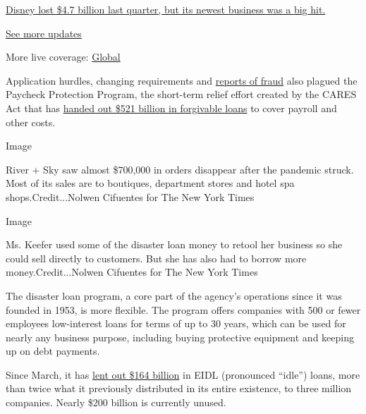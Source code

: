 \href{https://www.nytimes3xbfgragh.onion/live/2020/08/04/business/stock-market-today-coronavirus?action=click\&pgtype=Article\&state=default\&region=MAIN_CONTENT_1\&context=storylines_live_updates\#disney-lost-4-7-billion-last-quarter-but-its-newest-business-was-a-big-hit}{Disney
lost \$4.7 billion last quarter, but its newest business was a big hit.}

\href{https://www.nytimes3xbfgragh.onion/live/2020/08/04/business/stock-market-today-coronavirus?action=click\&pgtype=Article\&state=default\&region=MAIN_CONTENT_1\&context=storylines_live_updates}{See
more updates}

More live coverage:
\href{https://www.nytimes3xbfgragh.onion/2020/08/04/world/coronavirus-cases.html?action=click\&pgtype=Article\&state=default\&region=MAIN_CONTENT_1\&context=storylines_live_updates}{Global}

Application hurdles, changing requirements and
\href{https://www.nytimes3xbfgragh.onion/2020/07/27/us/lamborghini-ppp-covid-19.html}{reports
of fraud} also plagued the Paycheck Protection Program, the short-term
relief effort created by the CARES Act that has
\href{https://www.nytimes3xbfgragh.onion/2020/06/30/business/paycheck-protection-program-coronavirus.html}{handed
out \$521 billion in forgivable loans} to cover payroll and other costs.

Image

River + Sky saw almost \$700,000 in orders disappear after the pandemic
struck. Most of its sales are to boutiques, department stores and hotel
spa shops.Credit...Nolwen Cifuentes for The New York Times

Image

Ms. Keefer used some of the disaster loan money to retool her business
so she could sell directly to customers. But she has also had to borrow
more money.Credit...Nolwen Cifuentes for The New York Times

The disaster loan program, a core part of the agency's operations since
it was founded in 1953, is more flexible. The program offers companies
with 500 or fewer employees low-interest loans for terms of up to 30
years, which can be used for nearly any business purpose, including
buying protective equipment and keeping up on debt payments.

Since March, it has
\href{https://www.sba.gov/sites/default/files/2020-07/EIDL\%20COVID-19\%20Loan\%207.27.20-508.pdf}{lent
out \$164 billion} in EIDL (pronounced ``idle'') loans, more than twice
what it previously distributed in its entire existence, to three million
companies. Nearly \$200 billion is currently unused.

